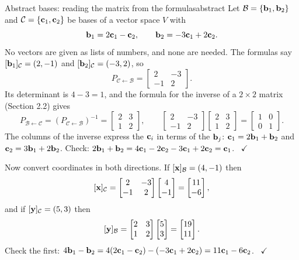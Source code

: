 \documentclass[11pt]{article}
\begin{document}
\begin{exmp}{Abstract bases: reading the matrix from the formulas}{abstract}
Let $\mathcal{B}=\{\mathbf{b}_1,\mathbf{b}_2\}$ and $\mathcal{C}=\{\mathbf{c}_1,\mathbf{c}_2\}$ be bases of a vector space $V$ with
\[
\mathbf{b}_1=2\mathbf{c}_1-\mathbf{c}_2,\qquad \mathbf{b}_2=-3\mathbf{c}_1+2\mathbf{c}_2.
\]
No vectors are given as lists of numbers, and none are needed. The formulas say $[\mathbf{b}_1]_{\mathcal{C}}=(2,-1)$ and $[\mathbf{b}_2]_{\mathcal{C}}=(-3,2)$, so
\[
P_{\mathcal{C}\leftarrow\mathcal{B}}=\begin{bmatrix}2&-3\\-1&2\end{bmatrix}.
\]
Its determinant is $4-3=1$, and the formula for the inverse of a $2\times2$ matrix (Section 2.2) gives
\[
P_{\mathcal{B}\leftarrow\mathcal{C}}=\left(P_{\mathcal{C}\leftarrow\mathcal{B}}\right)^{-1}=\begin{bmatrix}2&3\\1&2\end{bmatrix},\qquad \begin{bmatrix}2&-3\\-1&2\end{bmatrix}\begin{bmatrix}2&3\\1&2\end{bmatrix}=\begin{bmatrix}1&0\\0&1\end{bmatrix}.
\]
The columns of the inverse express the $\mathbf{c}_i$ in terms of the $\mathbf{b}_j$: $\mathbf{c}_1=2\mathbf{b}_1+\mathbf{b}_2$ and $\mathbf{c}_2=3\mathbf{b}_1+2\mathbf{b}_2$. Check: $2\mathbf{b}_1+\mathbf{b}_2=4\mathbf{c}_1-2\mathbf{c}_2-3\mathbf{c}_1+2\mathbf{c}_2=\mathbf{c}_1$. \ $\checkmark$

Now convert coordinates in both directions. If $[\mathbf{x}]_{\mathcal{B}}=(4,-1)$ then
\[
[\mathbf{x}]_{\mathcal{C}}=\begin{bmatrix}2&-3\\-1&2\end{bmatrix}\begin{bmatrix}4\\-1\end{bmatrix}=\begin{bmatrix}11\\-6\end{bmatrix},
\]
and if $[\mathbf{y}]_{\mathcal{C}}=(5,3)$ then
\[
[\mathbf{y}]_{\mathcal{B}}=\begin{bmatrix}2&3\\1&2\end{bmatrix}\begin{bmatrix}5\\3\end{bmatrix}=\begin{bmatrix}19\\11\end{bmatrix}.
\]
Check the first: $4\mathbf{b}_1-\mathbf{b}_2=4(2\mathbf{c}_1-\mathbf{c}_2)-(-3\mathbf{c}_1+2\mathbf{c}_2)=11\mathbf{c}_1-6\mathbf{c}_2$. \ $\checkmark$
\end{exmp}
\end{document}
